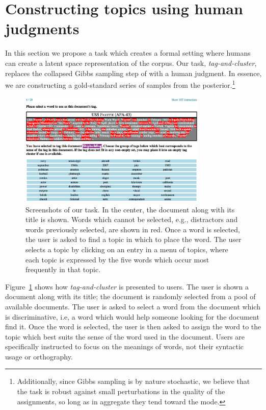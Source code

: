 \section{Constructing topics using human judgments}
\label{sec:tasks}
In this section we propose a task which creates a formal setting where
humans can create a latent space representation of the corpus.  Our
task, \emph{tag-and-cluster}, replaces the collapsed Gibbs sampling
step of  with a human judgment.  In essence, we are
constructing a gold-standard series of samples from the
posterior.\footnote{Additionally, since Gibbs sampling is by nature
  stochastic, we believe that the task is robust against small
  perturbations in the quality of the assignments, so long as in
  aggregate they tend toward the mode.}

\begin{figure}
\centering
\includegraphics[width=0.80\textwidth]{figures/screenshots.png}
\caption{Screenshots of our task.  In the center, the document along
  with its title is shown.  Words which cannot be selected, e.g.,
  distractors and words previously selected, are shown in red.  Once a
  word is selected, the user is asked to find a topic in which to
  place the word.  The user selects a topic by clicking on an entry in
  a menu of topics, where each topic is expressed by the five words
  which occur most frequently in that topic.}
\label{fig:screenshot}
\end{figure}

Figure~\ref{fig:screenshot} shows how \emph{tag-and-cluster} is
presented to users.  The user is shown a document along with
its title; the document is randomly selected from a pool of available
documents.  The user is asked to select a word from the document which
is discriminative, i.e, a word which would help someone looking for
the document find it.  Once the word is selected, the user is then
asked to assign the word to the topic which best suits the sense of
the word used in the document.  Users are specifically instructed to
focus on the meanings of words, not their syntactic usage or
orthography.

